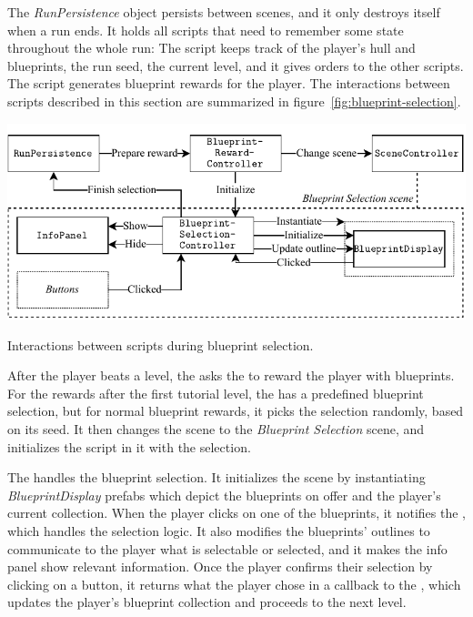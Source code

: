 The \emph{RunPersistence} object persists between scenes, and it only destroys itself when a run ends.
It holds all scripts that need to remember some state throughout the whole run:
The  script keeps track of the player's hull and blueprints, the run seed, the current level, and it gives orders to the other scripts.
The  script generates blueprint rewards for the player.
The interactions between scripts described in this section are summarized in figure~\ref{fig:blueprint-selection}.
\begin{center}
    \captionsetup{type=figure}
    \includegraphics[width=\textwidth]{img/blueprint selection.pdf}
    \caption{Interactions between scripts during blueprint selection.}
    \label{fig:blueprint-selection}
\end{center}

After the player beats a level, the  asks the   to reward the player with blueprints.
For the rewards after the first tutorial level, the  has a predefined blueprint selection, but for normal blueprint rewards, it picks the selection randomly, based on its seed.
It then changes the scene to the \emph{Blueprint Selection} scene, and initializes the  script in it with the selection.

The  handles the blueprint selection.
It initializes the scene by instantiating \emph{BlueprintDisplay} prefabs which depict the blueprints on offer and the player's current collection.
When the player clicks on one of the blueprints, it notifies the , which handles the selection logic.
It also modifies the blueprints' outlines to communicate to the player what is selectable or selected, and it makes the info panel show relevant information.
Once the player confirms their selection by clicking on a button, it returns what the player chose in a callback to the , which updates the player's blueprint collection and proceeds to the next level.

